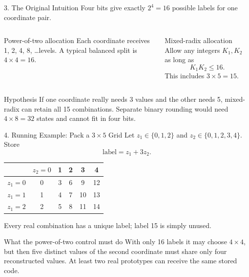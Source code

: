 \documentclass[aspectratio=169]{beamer}
\begin{document}
\begin{frame}{3. The Original Intuition}
Four bits give exactly \(2^4=16\) possible labels for one coordinate pair.
\medskip
\begin{columns}[T]
\begin{block}{Power-of-two allocation}
Each coordinate receives 1, 2, 4, 8, \ldots levels. A typical balanced split
is \(4\times4=16\).
\end{block}
\begin{block}{Mixed-radix allocation}
Allow any integers \(K_1,K_2\) as long as
\[
K_1K_2\leq16.
\]
This includes \(3\times5=15\).
\end{block}
\end{columns}
\begin{alertblock}{Hypothesis}
If one coordinate really needs 3 values and the other needs 5, mixed-radix can
retain all 15 combinations. Separate binary rounding would need
\(4\times8=32\) states and cannot fit in four bits.
\end{alertblock}
\end{frame}

\begin{frame}{4. Running Example: Pack a \(3\times5\) Grid}
\small
Let \(z_1\in\{0,1,2\}\) and \(z_2\in\{0,1,2,3,4\}\). Store
\[
\text{label}=z_1+3z_2.
\]
\begin{center}
\begin{tabular}{c|ccccc}
\toprule
& \(z_2=0\) & 1 & 2 & 3 & 4\\
\midrule
\(z_1=0\) & 0 & 3 & 6 & 9 & 12\\
\(z_1=1\) & 1 & 4 & 7 & 10 & 13\\
\(z_1=2\) & 2 & 5 & 8 & 11 & 14\\
\bottomrule
\end{tabular}
\end{center}
Every real combination has a unique label; label 15 is simply unused.
\medskip
\begin{block}{What the power-of-two control must do}
With only 16 labels it may choose \(4\times4\), but then five distinct values
of the second coordinate must share only four reconstructed values. At least
two real prototypes can receive the same stored code.
\end{block}
\end{frame}
\end{document}
